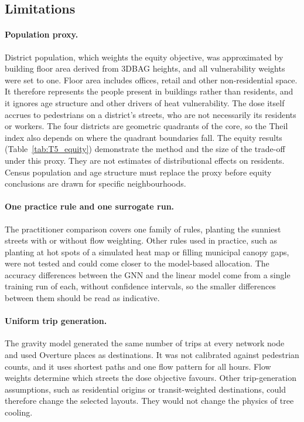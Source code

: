 \documentclass[preprint,12pt,authoryear]{elsarticle}
\begin{document}
\subsection{Limitations}\label{sec:limitations}

\paragraph{Population proxy.} District population, which weights the equity objective, was approximated by building floor area derived from 3DBAG heights, and all vulnerability weights were set to one. Floor area includes offices, retail and other non-residential space. It therefore represents the people present in buildings rather than residents, and it ignores age structure and other drivers of heat vulnerability. The dose itself accrues to pedestrians on a district's streets, who are not necessarily its residents or workers. The four districts are geometric quadrants of the core, so the Theil index also depends on where the quadrant boundaries fall. The equity results (Table~\ref{tab:T5_equity}) demonstrate the method and the size of the trade-off under this proxy. They are not estimates of distributional effects on residents. Census population and age structure must replace the proxy before equity conclusions are drawn for specific neighbourhoods.

\paragraph{One practice rule and one surrogate run.} The practitioner comparison covers one family of rules, planting the sunniest streets with or without flow weighting. Other rules used in practice, such as planting at hot spots of a simulated heat map or filling municipal canopy gaps, were not tested and could come closer to the model-based allocation. The accuracy differences between the GNN and the linear model come from a single training run of each, without confidence intervals, so the smaller differences between them should be read as indicative.

\paragraph{Uniform trip generation.} The gravity model generated the same number of trips at every network node and used Overture places as destinations. It was not calibrated against pedestrian counts, and it uses shortest paths and one flow pattern for all hours. Flow weights determine which streets the dose objective favours. Other trip-generation assumptions, such as residential origins or transit-weighted destinations, could therefore change the selected layouts. They would not change the physics of tree cooling.
\end{document}
